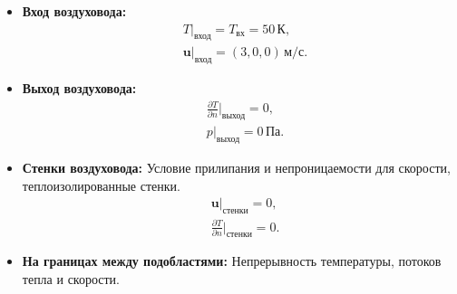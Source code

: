 \documentclass[a4paper,12pt]{extreport}
\numberwithin{equation}{chapter}
\begin{document}
\begin{itemize}
	\item \textbf{Вход воздуховода:}
	      \begin{align*}
		       & T|_\text{вход} = T_\text{вх} = 50 \, \text{К},     \\
		       & \mathbf{u}|_\text{вход} = (3, 0, 0) \, \text{м/с}.
	      \end{align*}
	\item \textbf{Выход воздуховода:}
	      \begin{align*}
		       & \frac{\partial T}{\partial n}\bigg|_\text{выход} = 0, \\
		       & p|_\text{выход} = 0 \, \text{Па}.
	      \end{align*}
	\item \textbf{Стенки воздуховода:} Условие прилипания и непроницаемости для скорости, теплоизолированные стенки.
	      \begin{align*}
		       & \mathbf{u}|_\text{стенки} = 0,                         \\
		       & \frac{\partial T}{\partial n}\bigg|_\text{стенки} = 0.
	      \end{align*}
	\item \textbf{На границах между подобластями:} Непрерывность температуры, потоков тепла и скорости.
\end{itemize}
\end{document}
